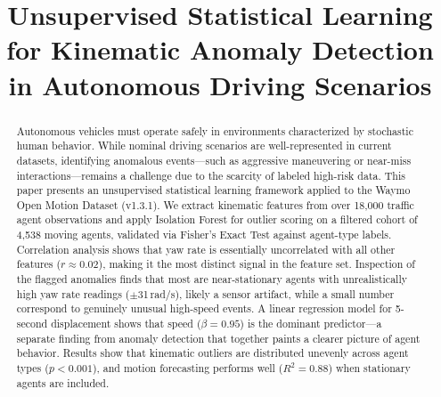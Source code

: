 \documentclass[conference]{IEEEtran}
\begin{document}
\title{Unsupervised Statistical Learning for Kinematic Anomaly Detection in Autonomous Driving Scenarios}

\author{
\and
{}
\and
{}
}

\maketitle

\begin{abstract}
Autonomous vehicles must operate safely in environments characterized by stochastic human behavior. While nominal driving scenarios are well-represented in current datasets, identifying anomalous events---such as aggressive maneuvering or near-miss interactions---remains a challenge due to the scarcity of labeled high-risk data. This paper presents an unsupervised statistical learning framework applied to the Waymo Open Motion Dataset (v1.3.1). We extract kinematic features from over 18{,}000 traffic agent observations and apply Isolation Forest for outlier scoring on a filtered cohort of 4{,}538 moving agents, validated via Fisher's Exact Test against agent-type labels. Correlation analysis shows that yaw rate is essentially uncorrelated with all other features ($r \approx 0.02$), making it the most distinct signal in the feature set. Inspection of the flagged anomalies finds that most are near-stationary agents with unrealistically high yaw rate readings ($\pm$31\,rad/s), likely a sensor artifact, while a small number correspond to genuinely unusual high-speed events. A linear regression model for 5-second displacement shows that speed ($\beta = 0.95$) is the dominant predictor---a separate finding from anomaly detection that together paints a clearer picture of agent behavior. Results show that kinematic outliers are distributed unevenly across agent types ($p < 0.001$), and motion forecasting performs well ($R^2 = 0.88$) when stationary agents are included.
\end{abstract}
\end{document}
